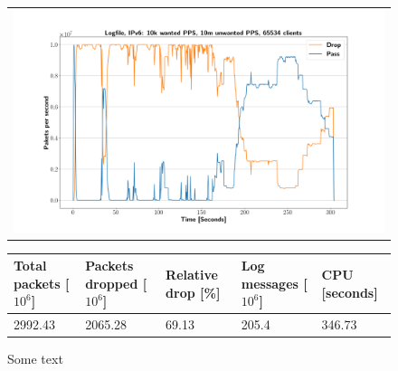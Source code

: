 \begin{figure}[p]
	\label{fig:simplefail2ban:disk:ip6:10m}
	\centering
	\scriptsize
	\begin{tabular}{c}
    	\centerline{\includegraphics[width=1.2\textwidth]{images/simplefail2ban_disk_ipv6_v10k_iv10m_c65534.png}}
	\end{tabular}
	\begin{tabular}{lllll}
		\toprule
		\textbf{Total packets [$10^6$]} & \textbf{Packets dropped [$10^6$]} & \textbf{Relative drop [\%]} & \textbf{Log messages [$10^6$]} & \textbf{CPU [seconds]} \\ \midrule 
		2992.43 & 2065.28 & 69.13 & 205.4 & 346.73 \\
		\bottomrule
	\end{tabular}
	\caption[Simplefail2ban, Logfile IPv6, 10m \ac{PPS}]{Some text}
\end{figure}

